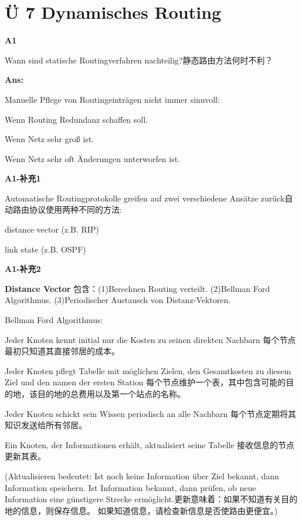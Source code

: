 \documentclass[fleqn]{article}
\begin{document}
\section{Ü 7 Dynamisches Routing}

\noindent\textbf{A1}

Wann sind statische Routingverfahren nachteilig?静态路由方法何时不利？

\textbf{Ans:}

Manuelle Pflege von Routingeinträgen nicht immer sinnvoll:

\indent \indent Wenn Routing Redundanz schaffen soll.

\indent \indent Wenn Netz sehr groß ist.

\indent \indent Wenn Netz sehr oft Änderungen unterworfen ist.

\noindent\textbf{A1-补充1}

Automatische Routingprotokolle greifen auf zwei verschiedene Ansätze zurück自动路由协议使用两种不同的方法:

\indent \indent distance vector (z.B. RIP)

\indent \indent link state (z.B. OSPF)

\noindent\textbf{A1-补充2}

\textbf{Distance Vector} 包含：(1)Berechnen Routing verteilt. (2)Bellman Ford Algorithmus. (3)Periodischer Austausch von Distanz-Vektoren.

Bellman Ford Algorithmus:

\indent \indent Jeder Knoten kennt initial nur die Kosten zu seinen direkten Nachbarn
每个节点最初只知道其直接邻居的成本。

\indent \indent Jeder Knoten pflegt Tabelle mit möglichen Zielen, den Gesamtkosten zu diesem Ziel und den namen der ersten Station
每个节点维护一个表，其中包含可能的目的地，该目的地的总费用以及第一个站点的名称。

\indent \indent Jeder Knoten schickt sein Wissen periodisch an alle Nachbarn
每个节点定期将其知识发送给所有邻居。

\indent \indent Ein Knoten, der Informationen erhält, aktualisiert seine Tabelle
接收信息的节点更新其表。

\indent \indent (Aktualisieren bedeutet: Ist noch keine Information über Ziel bekannt, dann Information speichern. Ist Information bekannt, dann prüfen, ob neue Information eine günstigere Strecke ermöglicht.更新意味着：如果不知道有关目的地的信息，则保存信息。 如果知道信息，请检查新信息是否使路由更便宜。)
\end{document}
